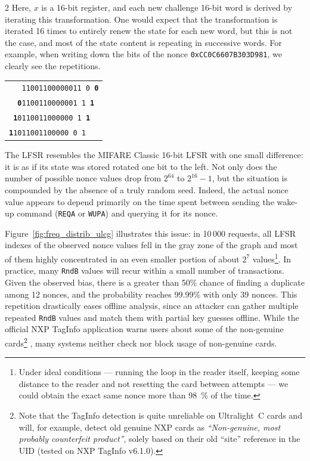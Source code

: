 \documentclass[10pt,letterpaper]{article}
\begin{document}
\begin{multicols}{2}
Here, $x$ is a 16-bit register, and each new challenge 16-bit word is derived by iterating this transformation. One would expect that the transformation is iterated 16 times to entirely renew the state for each new word, but this is not the case, and most of the state content is repeating in successive words. For example, when writing down the bits of the nonce \texttt{0xCC0C6607B303D981}, we clearly see the repetitions.
\begin{center}
\begin{tabular}{l}
\texttt{~~~11001100000011~0~\textbf{0}}\\
\texttt{~~\textbf{0}1100110000001~1~\textbf{1}~}\\
\texttt{~\textbf{1}0110011000000~1~\textbf{1}~~}\\
\texttt{\textbf{1}1011001100000~0~1~~~}\\
\end{tabular}
\end{center}

The LFSR resembles the MIFARE Classic 16-bit LFSR with one small difference: it is as if its state was stored rotated one bit to the left.
Not only does the number of possible nonce values drop from $2^{64}$ to $2^{16}-1$, but the situation is compounded by the absence of a truly random seed. Indeed, the actual nonce value appears to depend primarily on the time spent between sending the wake-up command (\texttt{REQA} or \texttt{WUPA}) and querying it for its nonce.

\begin{center}
    \resizebox{1.0\linewidth}{!}{}
    \captionsetup{hypcap=false}
    \label{fig:freq_distrib_ulcg}
\end{center}

Figure~\ref{fig:freq_distrib_ulcg} illustrates this issue: in 10\,000 requests, all LFSR indexes of the observed nonce values fell in the gray zone of the graph and most of them highly concentrated in an even smaller portion of about $2^{7}$ values\footnote{Under ideal conditions --- running the loop in the reader itself, keeping some distance to the reader and not resetting the card between attempts --- we could obtain the exact same nonce more than 98~\% of the time.}.
In practice, many \texttt{RndB} values will recur within a small number of transactions. Given the observed bias, there is a greater than 50\% chance of finding a duplicate among 12 nonces, and the probability reaches 99.99\%  with only 39 nonces. This repetition drastically eases offline analysis, since an attacker can gather multiple repeated \texttt{RndB} values and match them with partial key guesses offline. While the official NXP TagInfo application warns users about some of the non-genuine cards\footnote{Note that the TagInfo detection is quite unreliable on Ultralight~C cards and will, for example, detect old genuine NXP cards as \emph{``Non-genuine, most probably counterfeit product''}, solely based on their old ``site'' reference in the UID (tested on NXP TagInfo v6.1.0).}
, many systems neither check nor block usage of non-genuine cards.


\end{multicols}
\end{document}
